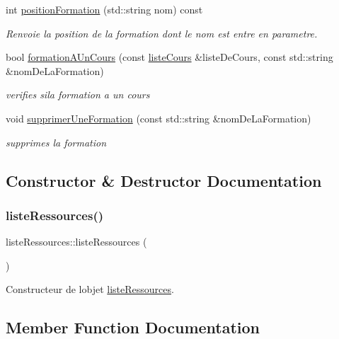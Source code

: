 \begin{DoxyCompactItemize}
int \hyperlink{classliste_ressources_a1649d1144f57339c52731acf2d5cfa51}{position\+Formation} (std\+::string nom) const
\begin{DoxyCompactList}\small\item\em Renvoie la position de la formation dont le nom est entre en parametre. \end{DoxyCompactList}\item 
bool \hyperlink{classliste_ressources_adca8580fb284edf37def6b5f650ea6a9}{formation\+A\+Un\+Cours} (const \hyperlink{classliste_cours}{liste\+Cours} \&liste\+De\+Cours, const std\+::string \&nom\+De\+La\+Formation)
\begin{DoxyCompactList}\small\item\em verifies sila formation a un cours \end{DoxyCompactList}\item 
void \hyperlink{classliste_ressources_a898637edf00749de0460b3ce07168a71}{supprimer\+Une\+Formation} (const std\+::string \&nom\+De\+La\+Formation)
\begin{DoxyCompactList}\small\item\em supprimes la formation \end{DoxyCompactList}\end{DoxyCompactItemize}


\subsection{Constructor \& Destructor Documentation}
\hypertarget{classliste_ressources_a3f49a0916898d200295e0e6593253e73}{}\label{classliste_ressources_a3f49a0916898d200295e0e6593253e73} 
\subsubsection{\texorpdfstring{liste\+Ressources()}{listeRessources()}}
{\footnotesize\ttfamily liste\+Ressources\+::liste\+Ressources (\begin{DoxyParamCaption}{ }\end{DoxyParamCaption})}



Constructeur de l\textquotesingle{}objet \hyperlink{classliste_ressources}{liste\+Ressources}. 



\subsection{Member Function Documentation}
\hypertarget{classliste_ressources_a3b12d0a99dedc81a6a9ddfde375f3c3e}{}\label{classliste_ressources_a3b12d0a99dedc81a6a9ddfde375f3c3e} 
